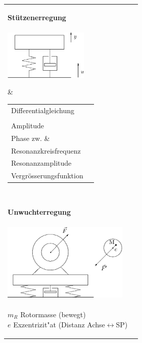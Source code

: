 \begin{tabular}{|l|l|}
\hline
\parbox{6cm}{
	\textbf{Stützenerregung}\\ \\
	\includegraphics[width=4cm]{./bilder/stuetzenerregung.png}}
	& \begin{minipage}[]{12cm}
      \renewcommand{\arraystretch}{2}
		\begin{tabular}{ll}
    	Differentialgleichung
    		& $m\,\ddot{y}+b\,\dot{y}+c\,y=$
    		\textcolor{blue}{$c\,u_0\,\sin(\omega t) + b\,\omega\,u_0\,\cos(\omega t)$}
    		\\ & $m\, \ddot{q} + b\,\dot{q} + c\,q =$
    		\textcolor{blue}{$m\,\omega^2\,u_0\,\sin(\omega t)$} \\
    	Amplitude
    		&
    		$A=\dfrac{\omega^2\,u_0}{m\sqrt{(\omega_0^2-\omega^2)^2+(2D\,\omega_0\,\omega)^2}}$ \\
    	Phase zw. $\omega_0$ \& $\omega$
    		&
    		$\varphi=\arctan\left(\dfrac{2D\,\omega_0\,\omega}{\omega_0^2-\omega^2}\right)-\pi$\\ 
    	Resonanzkreisfrequenz
    		& $\omega_r=\dfrac{\omega_0}{\sqrt{1-2D^2}}$\\
    	Resonanzamplitude
    		& $A_r=\dfrac{u_0}{2D\sqrt{1-D^2}}$\\
    	Vergrösserungsfunktion
    		& $V=\dfrac{\eta^2}{\sqrt{(1-\eta^2)^2+(2D\eta)^2}}$ 
		\end{tabular}
    \end{minipage} \\
\hline
\parbox{6cm}{
	\textbf{Unwuchterregung}\\ \\
	\includegraphics[width=6cm]{./bilder/unwuchterregung.png}\\ \\
	$m_R$ Rotormasse (bewegt)\\
	$e$ Exzentrizit"at (Distanz Achse$\leftrightarrow$SP) \\
}
\end{tabular}
